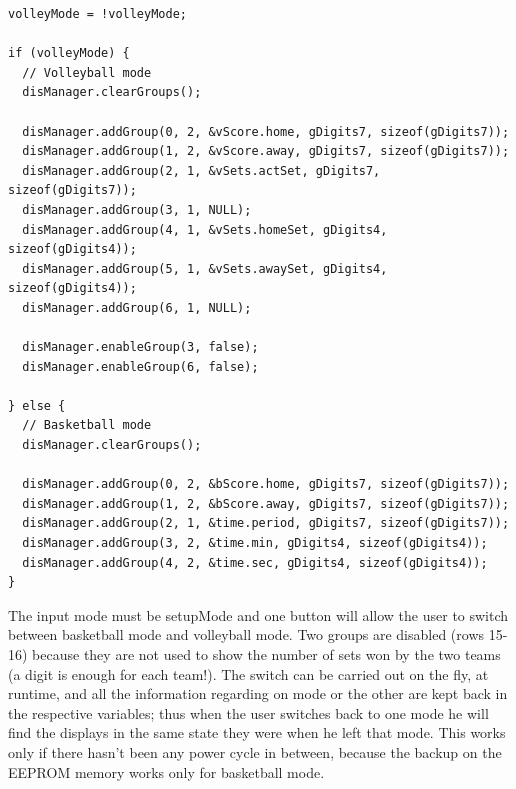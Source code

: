 \documentclass[11pt,english]{article}
\begin{document}
%
\begin{lstlisting}[label=lis:volleyMode,caption=Volleyball mode activation and deactivation]
volleyMode = !volleyMode;

if (volleyMode) {
  // Volleyball mode
  disManager.clearGroups();

  disManager.addGroup(0, 2, &vScore.home, gDigits7, sizeof(gDigits7));
  disManager.addGroup(1, 2, &vScore.away, gDigits7, sizeof(gDigits7));
  disManager.addGroup(2, 1, &vSets.actSet, gDigits7, sizeof(gDigits7));
  disManager.addGroup(3, 1, NULL);
  disManager.addGroup(4, 1, &vSets.homeSet, gDigits4, sizeof(gDigits4));
  disManager.addGroup(5, 1, &vSets.awaySet, gDigits4, sizeof(gDigits4));
  disManager.addGroup(6, 1, NULL);

  disManager.enableGroup(3, false);
  disManager.enableGroup(6, false);

} else {
  // Basketball mode
  disManager.clearGroups();
  
  disManager.addGroup(0, 2, &bScore.home, gDigits7, sizeof(gDigits7));
  disManager.addGroup(1, 2, &bScore.away, gDigits7, sizeof(gDigits7));
  disManager.addGroup(2, 1, &time.period, gDigits7, sizeof(gDigits7));
  disManager.addGroup(3, 2, &time.min, gDigits4, sizeof(gDigits4));
  disManager.addGroup(4, 2, &time.sec, gDigits4, sizeof(gDigits4));
}
\end{lstlisting}

The input mode must be setupMode and one button will allow the user to switch between basketball mode and 
volleyball mode. Two groups are disabled (rows 15-16) because they are not used to show the number of 
sets won by the two teams (a digit is enough for each team!).
The switch can be carried out on the fly, at runtime, and all the information regarding on mode or the other 
are kept back in the respective variables; thus when the user switches back to one mode he will find the displays 
in the same state they were when he left that mode. This works only if there hasn't been any power cycle in between, 
because the backup on the EEPROM memory works only for basketball mode. 
\end{document}
